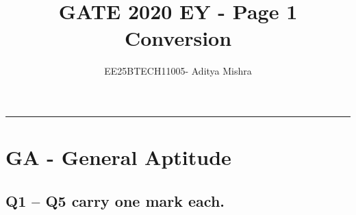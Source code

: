 




\title{GATE 2020 EY - Page 1 Conversion}
\author{EE25BTECH11005- Aditya Mishra}
\maketitle

\rule{\columnwidth}{0.3pt}

\section*{GA - General Aptitude}
\subsection*{Q1 -- Q5 carry one mark each.}

